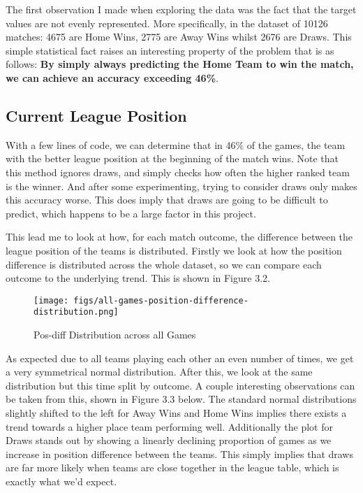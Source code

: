 \documentclass[12pt,a4paper,twoside,openright]{report}
\begin{document}
The first observation I made when exploring the data was the fact that the target values are not evenly represented. More specifically, in the dataset of 10126 matches: 4675 are Home Wins, 2775 are Away Wins whilst 2676 are Draws. This simple statistical fact raises an interesting property of the problem that is as follows: \textbf{By simply always predicting the Home Team to win the match, we can achieve an accuracy exceeding 46\%}.

\subsection{Current League Position}

With a few lines of code, we can determine that in 46\% of the games, the team with the better league position at the beginning of the match wins. Note that this method ignores draws, and simply checks how often the higher ranked team is the winner. And after some experimenting, trying to consider draws only makes this accuracy worse. This does imply that draws are going to be difficult to predict, which happens to be a large factor in this project.

This lead me to look at how, for each match outcome, the difference between the league position of the teams is distributed. Firstly we look at how the position difference is distributed across the whole dataset, so we can compare each outcome to the underlying trend. This is shown in Figure 3.2.

\begin{figure}
  \centering
  \texttt{[image: figs/all-games-position-difference-distribution.png]}
  \caption{Pos-diff Distribution across all Games}
  \label{fig:all-games-pos-diff-dist}
\end{figure}

As expected due to all teams playing each other an even number of times, we get a very symmetrical normal distribution. After this, we look at the same distribution but this time split by outcome. A couple interesting observations can be taken from this, shown in Figure 3.3 below. The standard normal distributions slightly shifted to the left for Away Wins and Home Wins implies there exists a trend towards a higher place team performing well. Additionally the plot for Draws stands out by showing a linearly declining proportion of games as we increase in position difference between the teams. This simply implies that draws are far more likely when teams are close together in the league table, which is exactly what we'd expect. 
\end{document}
